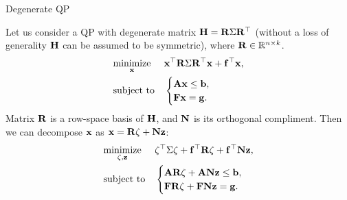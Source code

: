 \documentclass{beamer}
\begin{document}
\begin{frame}{Degenerate QP}
	\begin{flushleft}
		
		Let us consider a QP with degenerate matrix $\mathbf{H} = \mathbf{R} \Sigma \mathbf{R}^\top$ (without a loss of generality $\mathbf{H}$ can be assumed to be symmetric), where $\mathbf{R} \in \mathbb{R}^{n \times k}$.
		\begin{equation}
			\begin{aligned}
				& \underset{\mathbf{x}}{\text{minimize}}
				& & \mathbf{x}^\top \mathbf{R} \Sigma \mathbf{R}^\top \mathbf{x} + \mathbf{f}^\top\mathbf{x}, \\
				& \text{subject to}
				& & \begin{cases}
					\mathbf{A}\mathbf{x} \leq \mathbf{b}, \\
					\mathbf{F}\mathbf{x} = \mathbf{g}.
				\end{cases}
			\end{aligned}
		\end{equation}
		Matrix $\mathbf{R}$ is a row-space basis of $\mathbf{H}$, and $\mathbf{N}$ is its orthogonal compliment. Then we can decompose $\mathbf{x}$ as $\mathbf{x} = \mathbf{R}\zeta+\mathbf{N}\mathbf{z}$:
		\begin{equation}
			\begin{aligned}
				& \underset{\zeta, \mathbf{z}}{\text{minimize}}
				& & \zeta^\top \Sigma \zeta + \mathbf{f}^\top\mathbf{R}\zeta+\mathbf{f}^\top\mathbf{N}\mathbf{z}, \\
				& \text{subject to}
				& & \begin{cases}
					\mathbf{A}\mathbf{R}\zeta+\mathbf{A}\mathbf{N}\mathbf{z} \leq \mathbf{b}, \\
					\mathbf{F}\mathbf{R}\zeta+\mathbf{F}\mathbf{N}\mathbf{z} = \mathbf{g}.
				\end{cases}
			\end{aligned}
		\end{equation}
		
	\end{flushleft}
\end{frame}
\end{document}
